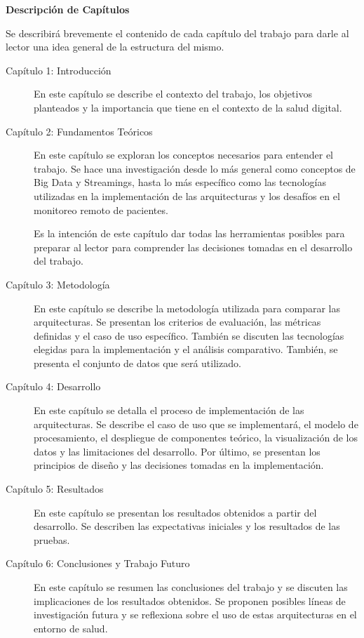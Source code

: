 \begin{center}
    \Large\bfseries Descripción de Capítulos
\end{center}
\vspace{1cm}

Se describirá brevemente el contenido de cada capítulo del trabajo para darle al lector una idea general de la estructura del mismo.

\begin{description}
    \item[Capítulo 1: Introducción]
    En este capítulo se describe el contexto del trabajo, los objetivos planteados y la importancia que tiene en el contexto de la salud digital. 
    \item[Capítulo 2: Fundamentos Teóricos]
    En este capítulo se exploran los conceptos necesarios para entender el trabajo.
    Se hace una investigación desde lo más general como conceptos de Big Data y Streamings, 
    hasta lo más específico como las tecnologías utilizadas en la implementación de las arquitecturas 
    y los desafíos en el monitoreo remoto de pacientes.  

    Es la intención de este capítulo dar todas las herramientas posibles para preparar al lector para comprender las decisiones tomadas en el desarrollo del trabajo.
    \item[Capítulo 3: Metodología]
    En este capítulo se describe la metodología utilizada para comparar las arquitecturas.
    Se presentan los criterios de evaluación, las métricas definidas y el caso de uso específico.
    También se discuten las tecnologías elegidas para la implementación y el análisis comparativo.
    También, se presenta el conjunto de datos que será utilizado.
    \item[Capítulo 4: Desarrollo]
    En este capítulo se detalla el proceso de implementación de las arquitecturas.
    Se describe el caso de uso que se implementará, 
    el modelo de procesamiento, el despliegue de componentes teórico, la visualización de los datos y las limitaciones del desarrollo.
    Por último, se presentan los principios de diseño y las decisiones tomadas en la implementación.
    \item[Capítulo 5: Resultados]
    En este capítulo se presentan los resultados obtenidos a partir del desarrollo.
    Se describen las expectativas iniciales y los resultados de las pruebas.
    \item[Capítulo 6: Conclusiones y Trabajo Futuro]
    En este capítulo se resumen las conclusiones del trabajo y se discuten las implicaciones de los resultados obtenidos. 
    Se proponen posibles líneas de investigación futura y se reflexiona sobre el uso de estas arquitecturas en el entorno de salud.
\end{description}